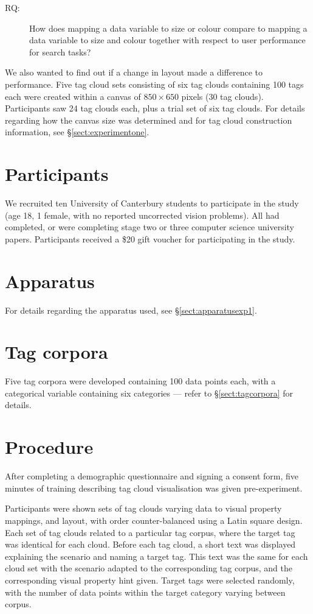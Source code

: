 \begin{description}
\item[RQ:]How does mapping a data variable to size or colour compare to mapping a data variable to size and colour together with respect to user performance for search tasks?
\end{description}

We also wanted to find out if a change in layout made a difference to performance. Five tag cloud sets consisting of six tag clouds containing 100 tags each were created within a canvas of $850 \times 650$ pixels (30 tag clouds). Participants saw 24 tag clouds each, plus a trial set of six tag clouds. For details regarding how the canvas size was determined and for tag cloud construction information, see \S\ref{sect:experimentone}.

\section{Participants}\label{sect:exp2participants}
We recruited ten University of Canterbury students to participate in the study (age 18, 1 female, with no reported uncorrected vision problems). All had completed, or were completing stage two or three computer science university papers.  Participants received a \$20 gift voucher for participating in the study.

\section{Apparatus}
For details regarding the apparatus used, see \S\ref{sect:apparatusexp1}.

\section{Tag corpora}
Five tag corpora were developed containing 100 data points each, with a categorical variable containing six categories --- refer to \S\ref{sect:tagcorpora} for details.

\section{Procedure}

After completing a demographic questionnaire and signing a consent form, five minutes of training describing tag cloud visualisation was given pre-experiment. 

Participants were shown sets of tag clouds varying data to visual property mappings, and layout, with order counter-balanced using a Latin square design. Each set of tag clouds related to a particular tag corpus, where the target tag was identical for each cloud.  Before each tag cloud, a short text was displayed explaining the scenario and naming a target tag. This text was the same for each cloud set with the scenario adapted to the corresponding tag corpus, and the corresponding visual property hint given. Target tags were selected randomly, with the number of data points within the target category varying between corpus.

